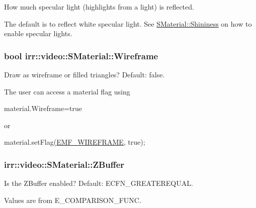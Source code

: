 How much specular light (highlights from a light) is reflected. 

The default is to reflect white specular light. See \hyperlink{classirr_1_1video_1_1SMaterial_a877106a83108db6d1f30a38379d28494}{S\+Material\+::\+Shininess} on how to enable specular lights. 
\subsubsection[{\texorpdfstring{Wireframe}{Wireframe}}]{\setlength{\rightskip}{0pt plus 5cm}bool irr\+::video\+::\+S\+Material\+::\+Wireframe}\hypertarget{classirr_1_1video_1_1SMaterial_a6fb428e6e27d0e143cc7da5ea19f8dcc}{}\label{classirr_1_1video_1_1SMaterial_a6fb428e6e27d0e143cc7da5ea19f8dcc}


Draw as wireframe or filled triangles? Default\+: false. 

The user can access a material flag using 
\begin{DoxyCode}
material.Wireframe=\textcolor{keyword}{true} 
\end{DoxyCode}
 or
\begin{DoxyCode}
material.setFlag(\hyperlink{namespaceirr_1_1video_a8a3bc00ae8137535b9fbc5f40add70d3abc620823efed8d6bdbd46c8a0180893a}{EMF\_WIREFRAME}, \textcolor{keyword}{true}); 
\end{DoxyCode}
\subsubsection[{\texorpdfstring{Z\+Buffer}{ZBuffer}}]{ irr\+::video\+::\+S\+Material\+::\+Z\+Buffer}\hypertarget{classirr_1_1video_1_1SMaterial_a7e604773b2ac61ab7a15ec9afef0dabf}{}\label{classirr_1_1video_1_1SMaterial_a7e604773b2ac61ab7a15ec9afef0dabf}


Is the Z\+Buffer enabled? Default\+: E\+C\+F\+N\+\_\+\+G\+R\+E\+A\+T\+E\+R\+E\+Q\+U\+AL. 

Values are from E\+\_\+\+C\+O\+M\+P\+A\+R\+I\+S\+O\+N\+\_\+\+F\+U\+NC. 
